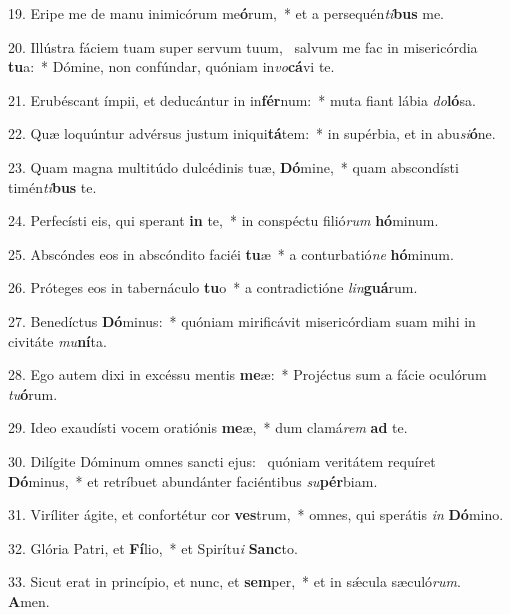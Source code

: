 19. Eripe me de manu inimicórum me\textbf{ó}rum,~*  et a persequén\textit{ti}\textbf{bus} me.\

20. Illústra fáciem tuam super servum tuum, \dag\  salvum me fac in misericórdia \textbf{tu}a:~*  Dómine, non confúndar, quóniam in\textit{vo}\textbf{cá}vi te.\

21. Erubéscant ímpii, et deducántur in in\textbf{fér}num:~*  muta fiant lábia \textit{do}\textbf{ló}sa.\

22. Quæ loquúntur advérsus justum iniqui\textbf{tá}tem:~*  in supérbia, et in abu\textit{si}\textbf{ó}ne.\

23. Quam magna multitúdo dulcédinis tuæ, \textbf{Dó}mine,~*  quam abscondísti timén\textit{ti}\textbf{bus} te.\

24. Perfecísti eis, qui sperant \textbf{in} te,~*  in conspéctu filió\textit{rum} \textbf{hó}minum.\

25. Abscóndes eos in abscóndito faciéi \textbf{tu}æ~*  a conturbatió\textit{ne} \textbf{hó}minum.\

26. Próteges eos in tabernáculo \textbf{tu}o~*  a contradictióne \textit{lin}\textbf{guá}rum.\

27. Benedíctus \textbf{Dó}minus:~*  quóniam mirificávit misericórdiam suam mihi in civitáte \textit{mu}\textbf{ní}ta.\

28. Ego autem dixi in excéssu mentis \textbf{me}æ:~*  Projéctus sum a fácie oculórum \textit{tu}\textbf{ó}rum.\

29. Ideo exaudísti vocem oratiónis \textbf{me}æ,~*  dum clamá\textit{rem} \textbf{ad} te.\

30. Dilígite Dóminum omnes sancti ejus: \dag\  quóniam veritátem requíret \textbf{Dó}minus,~*  et retríbuet abundánter faciéntibus \textit{su}\textbf{pér}biam.\

31. Viríliter ágite, et confortétur cor \textbf{ves}trum,~*  omnes, qui sperátis \textit{in} \textbf{Dó}mino.\

32. Glória Patri, et \textbf{Fí}lio,~*  et Spirítu\textit{i} \textbf{Sanc}to.\

33. Sicut erat in princípio, et nunc, et \textbf{sem}per,~*  et in sǽcula sæculó\textit{rum}. \textbf{A}men.\

